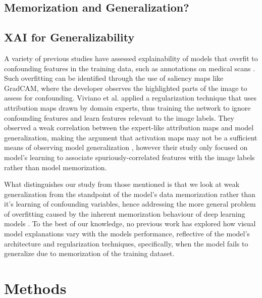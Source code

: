 \documentclass[conference]{IEEEtran}
\begin{document}
\subsection{Memorization and Generalization?}
\cite{tailabouttail}

\subsection{XAI for Generalizability}
A variety of previous studies have assessed explainability of models that overfit to confounding features in the training data, such as annotations on medical scans \cite{confounding}. Such overfitting can be identified through the use of saliency maps like GradCAM, where the developer observes the highlighted parts of the image to assess for confounding. Viviano et al. applied a regularization technique that uses attribution maps drawn by domain experts, thus training the network to ignore confounding features and learn features relevant to the image labels. They observed a weak correlation between the expert-like attribution maps and model generalization, making the argument that activation maps may not be a sufficient means of observing model generalization \cite{redherring}, however their study only focused on model's learning to associate spuriously-correlated features with the image labels rather than model memorization.

What distinguishes our study from those mentioned is that we look at weak generalization from the standpoint of the model's data memorization rather than it's learning of confounding variables, hence addressing the more general problem of overfitting caused by the inherent memorization behaviour of deep learning models \cite{labelrecorder}. To the best of our knowledge, no previous work has explored how visual model explanations vary with the models performance, reflective of the model’s architecture and regularization techniques, specifically, when the model fails to generalize due to memorization of the training dataset.

\section{Methods}
\label{methods}
\end{document}
